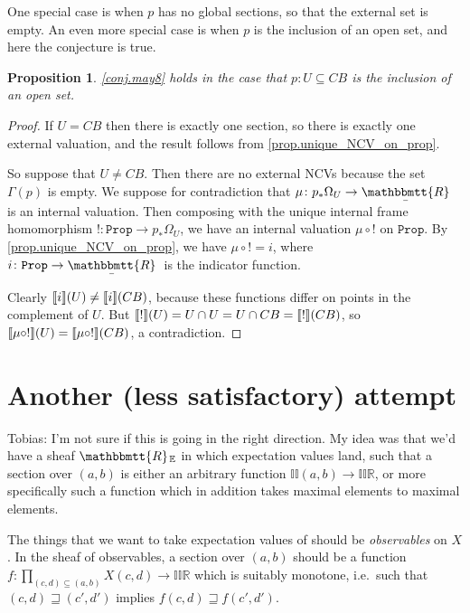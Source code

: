 \documentclass[11pt, oneside, article]{memoir}
\theoremstyle{plain}
\newtheorem{proposition}[theorem]{Proposition}
\theoremstyle{definition}
\theoremstyle{remark}
\renewcommand{\ss}{\subseteq}
\DeclarePairedDelimiter{\church}{\llbracket}{\rrbracket}
\newcommand{\const}[1]{\mathtt{#1}}
\newcommand{\ubar}[1]{\underaccent{\bar}{#1}}
\newcommand{\internal}[1]{\raisebox{-.03ex}{$\mathbbmtt{#1}$}}
\newcommand{\hs}{\hspace{1.1pt}}
\newcommand{\EE}{\mathbb{E}} %
\newcommand{\II}{\mathbb{II}} %
\newcommand{\RR}{\mathbb{R}}
\newcommand{\tRR}{\internal{R}\hs}
\newcommand{\tLR}{\ubar{\tRR}\hs}
\newcommand{\Prop}{\const{Prop}}
\begin{document}
One special case is when $p$ has no global sections, so that the external set is empty. An even more special case is when $p$ is the inclusion of an open set, and here the conjecture is true.

\begin{proposition}
\cref{conj.may8} holds in the case that $p\colon U\ss CB$ is the inclusion of an open set.
\end{proposition}
\begin{proof}
If $U=CB$ then there is exactly one section, so there is exactly one external valuation, and the result follows from \cref{prop.unique_NCV_on_prop}.

So suppose that $U\neq CB$. Then there are no external NCVs because the set $\Gamma(p)$ is empty. We suppose for contradiction that $\mu\colon p_*\Omega_U\to\tLR$ is an internal valuation. Then composing with the unique internal frame homomorphism $!\colon\Prop\to p_*\Omega_U$, we have an internal valuation $\mu\circ !$ on $\Prop$. By \cref{prop.unique_NCV_on_prop}, we have $\mu\circ!=i$, where $i\colon\Prop\to\tLR$ is the indicator function.

Clearly $\church{i}(U)\neq \church{i}(CB)$, because these functions differ on points in the complement of $U$. But $\church{!}(U)=U\cap U=U\cap CB=\church{!}(CB)$, so $\church{\mu\circ !}(U)=\church{\mu\circ!}(CB)$, a contradiction.
\end{proof}






\newpage

\appendix

\chapter{Another (less satisfactory) attempt}

Tobias: I'm not sure if this is going in the right direction. My idea was that we'd have a sheaf $\tRR_{\EE}$ in which expectation values land, such that a section over $(a,b)$ is either an arbitrary function $\II(a,b)\to\II\RR$, or more specifically such a function which in addition takes maximal elements to maximal elements.

The things that we want to take expectation values of should be \emph{observables} on $X$. In the sheaf of observables, a section over $(a,b)$ should be a function $f:\prod_{(c,d)\subseteq(a,b)} X(c,d)\to\II\RR$ which is suitably monotone, i.e.~such that $(c,d)\sqsupseteq(c',d')$ implies $f(c,d)\sqsupseteq f(c',d')$.
\end{document}

